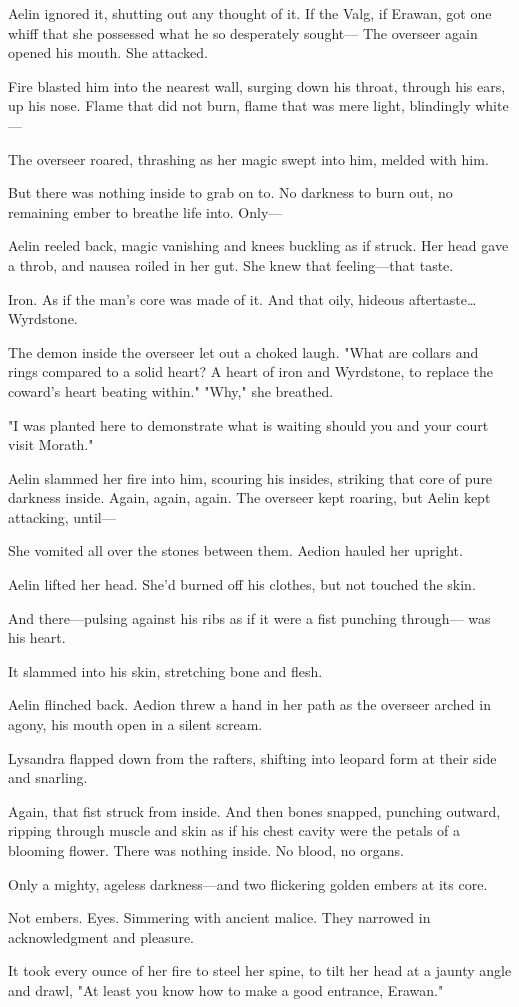Aelin ignored it, shutting out any thought of it.
If the Valg, if Erawan, got one whiff that she possessed what he so desperately sought--- The overseer again opened his mouth.
She attacked.

Fire blasted him into the nearest wall, surging down his throat, through his ears, up his nose.
Flame that did not burn, flame that was mere light, blindingly white---

The overseer roared, thrashing as her magic swept into him, melded with him.

But there was nothing inside to grab on to.
No darkness to burn out, no remaining ember to breathe life into.
Only---

Aelin reeled back, magic vanishing and knees buckling as if struck.
Her head gave a throb, and nausea roiled in her gut.
She knew that feeling---that taste.

Iron.
As if the man's core was made of it.
And that oily, hideous aftertaste\ldots Wyrdstone.

The demon inside the overseer let out a choked laugh.
"What are collars and rings compared to a solid heart?
A heart of iron and Wyrdstone, to replace the coward's heart beating within."
"Why," she breathed.

"I was planted here to demonstrate what is waiting should you and your court visit Morath."

Aelin slammed her fire into him, scouring his insides, striking that core of pure darkness inside.
Again, again, again.
The overseer kept roaring, but Aelin kept attacking, until---

She vomited all over the stones between them.
Aedion hauled her upright.

Aelin lifted her head.
She'd burned off his clothes, but not touched the skin.

And there---pulsing against his ribs as if it were a fist punching through--- was his heart.

It slammed into his skin, stretching bone and flesh.

Aelin flinched back.
Aedion threw a hand in her path as the overseer arched in agony, his mouth open in a silent scream.

Lysandra flapped down from the rafters, shifting into leopard form at their side and snarling.

Again, that fist struck from inside.
And then bones snapped, punching outward, ripping through muscle and skin as if his chest cavity were the petals of a blooming flower.
There was nothing inside.
No blood, no organs.

Only a mighty, ageless darkness---and two flickering golden embers at its core.

Not embers.
Eyes.
Simmering with ancient malice.
They narrowed in acknowledgment and pleasure.

It took every ounce of her fire to steel her spine, to tilt her head at a jaunty angle and drawl, "At least you know how to make a good entrance, Erawan."
